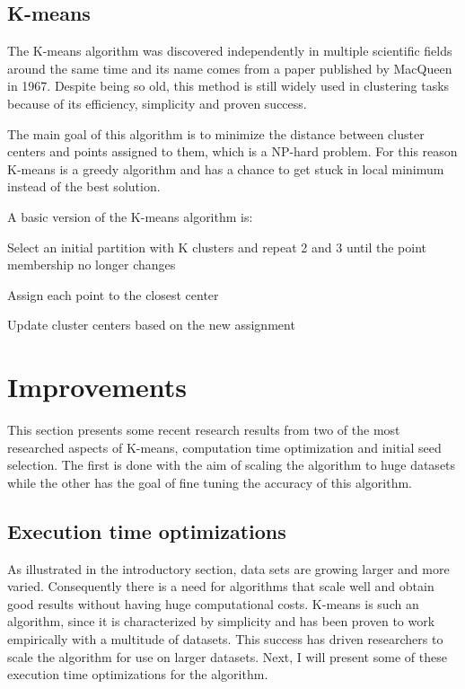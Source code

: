 \documentclass[12pt]{article}
\begin{document}
	\subsection{K-means}
	The K-means algorithm was discovered independently in multiple scientific fields around the same time and its name comes from a paper published by MacQueen in 1967\cite{DataClustering50yearsBeyondKmeans}. Despite being so old, this method is still widely used in clustering tasks because of its efficiency, simplicity and proven success.
	
	The main goal of this algorithm is to minimize the distance between cluster centers and points assigned to them, which is a NP-hard problem. For this reason K-means is a greedy algorithm and has a chance to get stuck in local minimum instead of the best solution\cite{DataClustering50yearsBeyondKmeans}.
	
	A basic version of the K-means algorithm is\cite{AlgorithmsForClusteringData}:
	\begin{compactenum}
		\item Select an initial partition with K clusters and repeat 2 and 3 until the point membership no longer changes
		\item Assign each point to the closest center
		\item Update cluster centers based on the new assignment
	\end{compactenum}
	
	\section{Improvements}
	This section presents some recent research results from two of the most researched aspects of K-means, computation time optimization and initial seed selection. The first is done with the aim of scaling the algorithm to huge datasets while the other has the goal of fine tuning the accuracy of this algorithm.
	
	\subsection{Execution time optimizations}
	As illustrated in the introductory section, data sets are growing larger and more varied. Consequently there is a need for algorithms that scale well and obtain good results without having huge computational costs. K-means is such an algorithm, since it is characterized by simplicity and has been proven to work empirically with a multitude of datasets\cite{DataClustering50yearsBeyondKmeans}. This success has driven researchers to scale the algorithm for use on larger datasets. Next, I will present some of these execution time optimizations for the algorithm.
	
\end{document}
